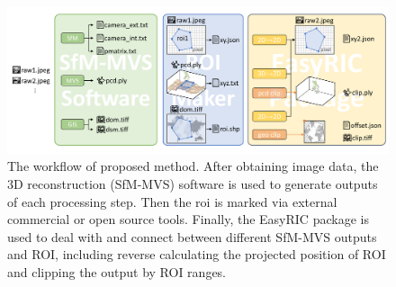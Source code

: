 \documentclass[doublespacing]{configs/bmcart}
\begin{document}
\begin{backmatter}




\begin{figure}[!htb]
  \includegraphics[width=0.95\linewidth]{figures/workflow.pdf}
  \caption{The workflow of proposed method. After obtaining image data, the 3D reconstruction (SfM-MVS) software is used to generate outputs of each processing step. Then the \acrfull*{roi} is marked via external commercial or open source tools. Finally, the EasyRIC package is used to deal with and connect between different SfM-MVS outputs and ROI, including reverse calculating the projected position of ROI and clipping the output by ROI ranges.}
  \label{fig:workflow}
\end{figure}


\end{backmatter}
\end{document}

